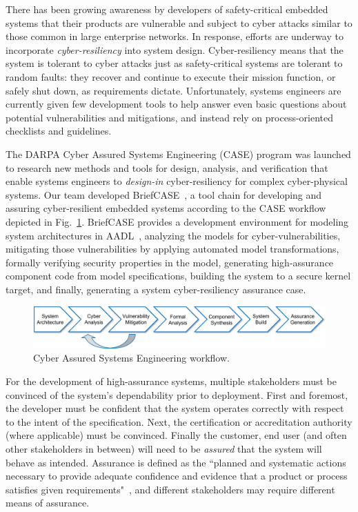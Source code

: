 
There has been growing awareness by developers of safety-critical embedded systems that their products are vulnerable and subject to cyber attacks similar to those common in large enterprise networks.  In response, efforts are underway to incorporate \textit{cyber-resiliency} into system design.  Cyber-resiliency means that the system is tolerant to cyber attacks just as safety-critical systems are tolerant to random faults: they recover and continue to execute their mission function, or safely shut down, as requirements dictate.  Unfortunately, systems engineers are currently given few development tools to help answer even basic questions about potential vulnerabilities and mitigations, and instead rely on process-oriented checklists and guidelines.

The DARPA Cyber Assured Systems Engineering (CASE) program was launched to research new methods and tools for design, analysis, and verification that enable systems engineers to \textit{design-in} cyber-resiliency for complex cyber-physical systems. 
%
Our team developed BriefCASE~\cite{case-at-scale}, a tool chain for developing and assuring cyber-resilient embedded systems according to the CASE workflow depicted in Fig.~\ref{fig:workflow}. BriefCASE provides a development environment for modeling system architectures in AADL~\cite{feiler-aadl}, analyzing the models for cyber-vulnerabilities, mitigating those vulnerabilities by applying automated model transformations, formally verifying security properties in the model, generating high-assurance component code from model specifications, building the system to a secure kernel target, and finally, generating a system cyber-resiliency assurance case.  

\begin{figure}[h] 
	\centering 
	\includegraphics[width=\textwidth]{figs/workflow.png}
	\caption{Cyber Assured Systems Engineering workflow.}
	\label{fig:workflow} 
\end{figure}

For the development of high-assurance systems, multiple stakeholders must be convinced of the system's dependability prior to deployment.  First and foremost, the developer must be confident that the system operates correctly with respect to the intent of the specification.  Next, the certification or accreditation authority (where applicable) must be convinced.  Finally the customer, end user (and often other stakeholders in between) will need to be \textit{assured} that the system will behave as intended.  
Assurance is defined as the ``planned and systematic actions necessary to provide adequate confidence and evidence that a product or process satisfies given requirements"~\cite{do-178c}, and different stakeholders may require different means of assurance.  

